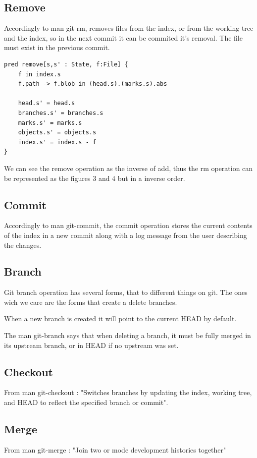 \pagebreak

\subsection{Remove}

Accordingly to man git-rm, removes files from the index, or from the
working tree and the index, so in the next commit it can be commited
it's removal. The file must exist in the
previous commit.\par

\begin{lstlisting}
pred remove[s,s' : State, f:File] {
	f in index.s
	f.path -> f.blob in (head.s).(marks.s).abs

	head.s' = head.s
	branches.s' = branches.s
	marks.s' = marks.s 
	objects.s' = objects.s
	index.s' = index.s - f
}
\end{lstlisting}

We can see the remove operation as the inverse of add, thus the rm 
operation can be represented as the figures 3 and 4 but in a inverse
order. \par

\subsection{Commit}

Accordingly to man git-commit, the commit operation 
stores the current contents of the index in a new commit 
along with a log message from the user describing the changes. \par 


\subsection{Branch}

Git branch operation has several forms, that to different things on git.
The ones wich we care are the forms that create a delete branches. \par
When a new branch is created it will point to the current HEAD by default.
\par
The man git-branch says that when deleting a branch, it must be fully
merged in its upstream branch, or in HEAD if no upstream was set. \par

\subsection{Checkout}

From man git-checkout : "Switches branches by updating the index, 
working tree, and HEAD to reflect the specified branch or commit". \par

\subsection{Merge}

From man git-merge : "Join two or mode development histories together" \par



